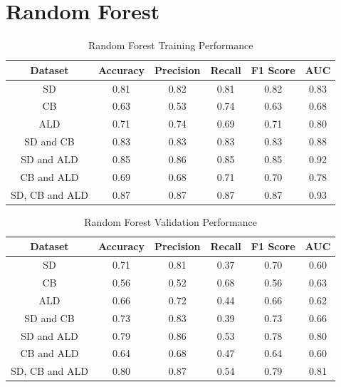 \vspace{10pt}



\section{Random Forest}

\vspace{10pt}

\begin{table}[H]
\begin{center}
\begin{tabular}{|c|c|c|c|c|c|} 
\hline
\multicolumn{1}{|c|}{Dataset}
&\multicolumn{1}{|c|}{Accuracy}
&\multicolumn{1}{|c|}{Precision}
&\multicolumn{1}{|c|}{Recall}
&\multicolumn{1}{|c|}{F1 Score}
&\multicolumn{1}{|c|}{AUC}\\
\hline
SD & 0.81 & 0.82 & 0.81 & 0.82 & 0.83    \\
\hline
CB & 0.63 & 0.53 & 0.74 & 0.63 & 0.68    \\
\hline
ALD & 0.71 & 0.74 & 0.69 & 0.71 & 0.80    \\
\hline
SD and CB & 0.83 & 0.83 & 0.83 & 0.83 & 0.88    \\
\hline
SD and ALD & 0.85 & 0.86 & 0.85 & 0.85 & 0.92    \\
\hline
CB and ALD & 0.69 & 0.68 & 0.71 & 0.70 & 0.78    \\
\hline
SD, CB and ALD & 0.87 & 0.87 & 0.87 & 0.87 & 0.93    \\
\hline
\end{tabular}
\end{center}
\caption{Random Forest Training Performance}
\label{table:rf training}
\end{table}

\vspace{10pt}

\begin{table}[H]
\begin{center}
\begin{tabular}{|c|c|c|c|c|c|} 
\hline
\multicolumn{1}{|c|}{Dataset}
&\multicolumn{1}{|c|}{Accuracy}
&\multicolumn{1}{|c|}{Precision}
&\multicolumn{1}{|c|}{Recall}
&\multicolumn{1}{|c|}{F1 Score}
&\multicolumn{1}{|c|}{AUC}\\
\hline
SD & 0.71 & 0.81 & 0.37 & 0.70 & 0.60    \\
\hline
CB & 0.56 & 0.52 & 0.68 & 0.56 & 0.63    \\
\hline
ALD & 0.66 & 0.72 & 0.44 & 0.66 & 0.62    \\
\hline
SD and CB & 0.73 & 0.83 & 0.39 & 0.73 & 0.66    \\
\hline
SD and ALD & 0.79 & 0.86 & 0.53 & 0.78 & 0.80    \\
\hline
CB and ALD & 0.64 & 0.68 & 0.47 & 0.64 & 0.60    \\
\hline
SD, CB and ALD & 0.80 & 0.87 & 0.54 & 0.79 & 0.81    \\
\hline
\end{tabular}
\end{center}
\caption{Random Forest Validation Performance}
\label{table:rf test}
\end{table}

